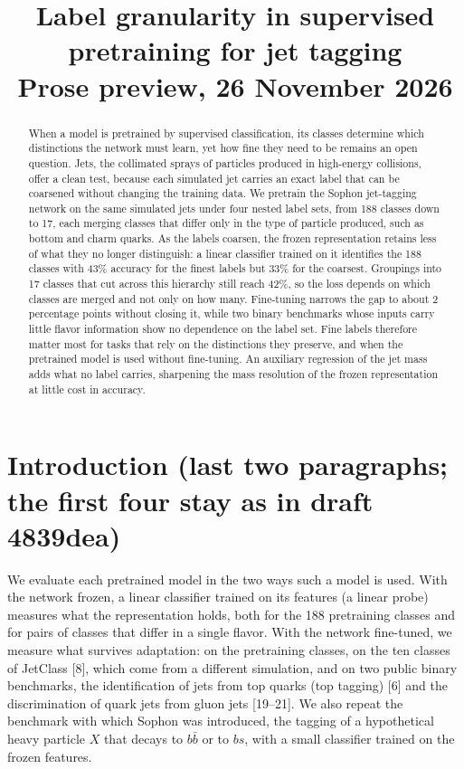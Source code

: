 \documentclass[11pt,a4paper]{article}
\title{\Large Label granularity in supervised pretraining for jet tagging\\[4pt]
\normalsize Prose preview, 26 November 2026}
\author{}
\date{}
\newcommand{\bn}[1]{\textcolor{blue!70!black}{#1}}
\newcommand{\ct}[1]{\textcolor{black!55}{[#1]}}
\newcommand{\bb}{b\bar{b}}
\begin{document}
\maketitle
{}

\begin{abstract}
\noindent
When a model is pretrained by supervised classification, its classes determine which distinctions
the network must learn, yet how fine they need to be remains an open question.
Jets, the collimated sprays of particles produced in high-energy collisions, offer a clean test,
because each simulated jet carries an exact label that can be coarsened without changing the
training data.
We pretrain the Sophon jet-tagging network on the same simulated jets under four nested label
sets, from 188 classes down to 17, each merging classes that differ only in the type of particle
produced, such as bottom and charm quarks.
As the labels coarsen, the frozen representation retains less of what they no longer distinguish:
a linear classifier trained on it identifies the 188 classes with \bn{43\%} accuracy for the
finest labels but \bn{33\%} for the coarsest.
Groupings into 17 classes that cut across this hierarchy still reach \bn{42\%}, so the loss
depends on which classes are merged and not only on how many.
Fine-tuning narrows the gap to about \bn{2} percentage points without closing it, while two
binary benchmarks whose inputs carry little flavor information show no dependence on the label
set.
Fine labels therefore matter most for tasks that rely on the distinctions they preserve, and when
the pretrained model is used without fine-tuning.
An auxiliary regression of the jet mass adds what no label carries, sharpening the mass
resolution of the frozen representation at little cost in accuracy.
\end{abstract}

\section{Introduction (last two paragraphs; the first four stay as in draft 4839dea)}
We evaluate each pretrained model in the two ways such a model is used.
With the network frozen, a linear classifier trained on its features (a linear probe) measures
what the representation holds, both for the 188 pretraining classes and for pairs of classes that
differ in a single flavor.
With the network fine-tuned, we measure what survives adaptation: on the pretraining classes, on
the ten classes of JetClass \ct{8}, which come from a different simulation, and on two public
binary benchmarks, the identification of jets from top quarks (top tagging) \ct{6} and the
discrimination of quark jets from gluon jets \ct{19--21}.
We also repeat the benchmark with which Sophon was introduced, the tagging of a hypothetical heavy
particle $X$ that decays to $\bb$ or to $bs$, with a small classifier trained on the frozen
features.
\end{document}
